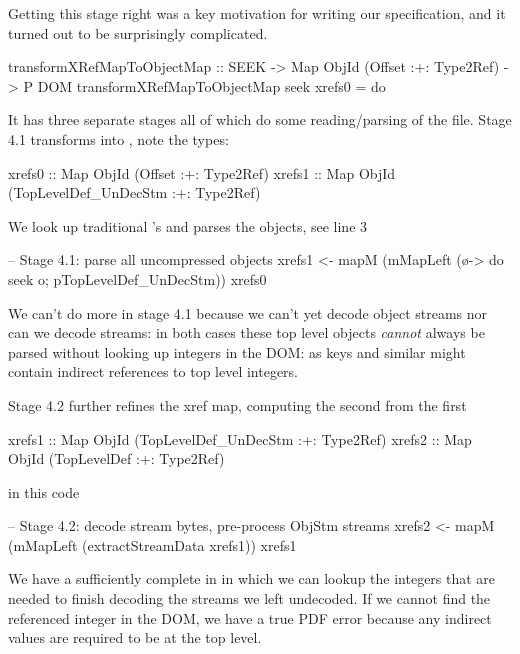 Getting this stage right was a key motivation for writing our
specification, and it turned out to be surprisingly complicated.
\begin{code}
transformXRefMapToObjectMap
  :: SEEK -> Map ObjId (Offset :+: Type2Ref) -> P DOM
transformXRefMapToObjectMap seek xrefs0 = do
\end{code}
It has three separate stages all of which do some reading/parsing of
the file. Stage 4.1
transforms  into , note the types:
\begin{codeNoExecute}
  xrefs0 :: Map ObjId (Offset               :+: Type2Ref) 
  xrefs1 :: Map ObjId (TopLevelDef_UnDecStm :+: Type2Ref)
\end{codeNoExecute}
%
We look up traditional 's and parses the objects,
see line 3
\begin{code}
    -- Stage 4.1: parse all uncompressed objects
    xrefs1 <- mapM
                (mMapLeft (\o-> do {seek o; pTopLevelDef_UnDecStm}))
                xrefs0
\end{code}
We can't do more in stage 4.1 because we can't yet decode
object streams nor can we decode streams: in both cases these top
level objects \emph{cannot} always be parsed without looking up
integers in the DOM: as  keys and similar might contain
indirect references to top level integers.

Stage 4.2 further refines the xref map, computing the second from the first
\begin{codeNoExecute}
  xrefs1 :: Map ObjId (TopLevelDef_UnDecStm :+: Type2Ref)
  xrefs2 :: Map ObjId (TopLevelDef          :+: Type2Ref) 
\end{codeNoExecute}
in this code
\begin{code}
    -- Stage 4.2: decode stream bytes, pre-process ObjStm streams
    xrefs2 <- mapM
                (mMapLeft (extractStreamData xrefs1))
                xrefs1
\end{code}
We have a sufficiently complete  in  in which
we can lookup the integers that are needed to finish decoding the
streams we left undecoded.
If we cannot find the referenced integer in the DOM, we have a true PDF
error because any indirect  values are required to be at the
top level.

